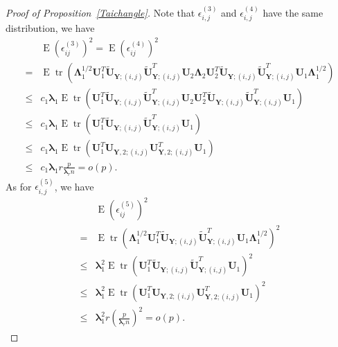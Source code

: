\documentclass[12pt]{article} %
\DeclareMathOperator{\mytr}{tr}
\DeclareMathOperator{\myE}{E}
\newcommand{\bY}{\mathbf{Y}}
\newcommand{\bU}{\mathbf{U}}
\newcommand{\bfsym}[1]{\ensuremath{\boldsymbol{#1}}}
\def\blambda {\bfsym {\lambda}}
\def\bLambda {\bfsym {\Lambda}}
\theoremstyle{definition}
\begin{document}
\begin{proof}[Proof of Proposition~\ref{Taichangle}]
        Note that $\epsilon_{i,j}^{(3)}$ and $\epsilon_{i,j}^{(4)}$ have the same distribution, we have
        $$
        \begin{aligned}
            &\myE(\epsilon_{ij}^{(3)})^2 =
            \myE(\epsilon_{ij}^{(4)})^2 \\
            =&\myE \mytr ( \bLambda_1^{1/2}\bU_1^T\tilde{\bU}_{\bY;(i,j)}\tilde{\bU}_{\bY;(i,j)}^T \bU_2 \bLambda_2 \bU_2^T \tilde{\bU}_{\bY;(i,j)}\tilde{\bU}_{\bY;(i,j)}^T \bU_1 \bLambda_1^{1/2})\\
            \leq& c_1 \blambda_1  \myE \mytr ( \bU_1^T\tilde{\bU}_{\bY;(i,j)}\tilde{\bU}_{\bY;(i,j)}^T \bU_2 \bU_2^T \tilde{\bU}_{\bY;(i,j)}\tilde{\bU}_{\bY;(i,j)}^T \bU_1 )\\
            \leq& c_1 \blambda_1  \myE \mytr ( \bU_1^T\tilde{\bU}_{\bY;(i,j)}\tilde{\bU}_{\bY;(i,j)}^T \bU_1 )\\
            \leq& c_1 \blambda_1  \myE \mytr ( \bU_1^T{\bU}_{\bY,2;(i,j)}{\bU}_{\bY,2;(i,j)}^T \bU_1 )\\
            \leq& c_1 \blambda_1 r \frac{p}{\blambda_r n}=o(p).
        \end{aligned}
        $$
        As for $\epsilon_{i,j}^{(5)}$, we have
        $$
        \begin{aligned}
            &\myE(\epsilon_{ij}^{(5)})^2 \\
            =&\myE \mytr (\bLambda_1^{1/2}\bU_1^T
            \tilde{\bU}_{\bY;(i,j)} \tilde{\bU}_{\bY;(i,j)}^T\bU_1 \bLambda_1^{1/2})^2\\
            \leq & \blambda_1^2\myE \mytr (\bU_1^T
            \tilde{\bU}_{\bY;(i,j)} \tilde{\bU}_{\bY;(i,j)}^T\bU_1 )^2\\
            \leq&  \blambda_1^2  \myE \mytr ( \bU_1^T{\bU}_{\bY,2;(i,j)}{\bU}_{\bY,2;(i,j)}^T \bU_1 )^2\\
            \leq& \blambda_1^2 r (\frac{p}{\blambda_r n})^2=o(p).
        \end{aligned}
        $$


\end{proof}
\end{document}

